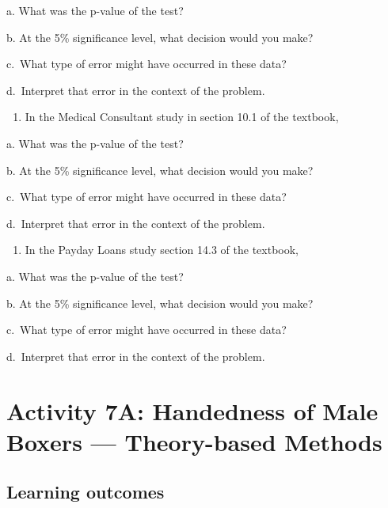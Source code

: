 \documentclass[
]{report}
\providecommand{\tightlist}{%
  \setlength{\itemsep}{0pt}\setlength{\parskip}{0pt}}
\newcommand{\rgs}{\vspace{12pt}} %
\newcommand{\rgi}{\hspace{24pt}}  %
\begin{document}
\rgi a. What was the p-value of the test?
\rgs

\rgi b. At the 5\% significance level, what decision would you make?
\rgs

\rgi c.~What type of error might have occurred in these data?
\rgs

\rgi d.~Interpret that error in the context of the problem.
\rgs
\rgs

\begin{enumerate}
\def\labelenumi{\arabic{enumi}.}
\setcounter{enumi}{1}
\tightlist
\item
  In the Medical Consultant study in section 10.1 of the textbook,
\end{enumerate}

\rgi a. What was the p-value of the test?
\rgs

\rgi b. At the 5\% significance level, what decision would you make?
\rgs

\rgi c.~What type of error might have occurred in these data?
\rgs

\rgi d.~Interpret that error in the context of the problem.
\rgs
\rgs

\begin{enumerate}
\def\labelenumi{\arabic{enumi}.}
\setcounter{enumi}{2}
\tightlist
\item
  In the Payday Loans study section 14.3 of the textbook,
\end{enumerate}

\rgi a. What was the p-value of the test?
\rgs

\rgi b. At the 5\% significance level, what decision would you make?
\rgs

\rgi c.~What type of error might have occurred in these data?
\rgs

\rgi d.~Interpret that error in the context of the problem.
\rgs

\newpage

\hypertarget{activity-7a-handedness-of-male-boxers-theory-based-methods}{%
\section{Activity 7A: Handedness of Male Boxers --- Theory-based Methods}\label{activity-7a-handedness-of-male-boxers-theory-based-methods}}


\hypertarget{learning-outcomes-12}{%
\subsection{Learning outcomes}\label{learning-outcomes-12}}
\end{document}
